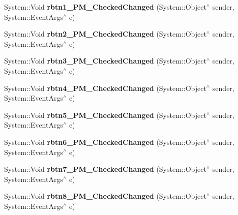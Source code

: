 \begin{DoxyCompactItemize}
\item 
\mbox{\label{class_project1_1_1_my_form_a0cfe390df7f37207a327be05de084f42}} 
System\+::\+Void {\bfseries rbtn1\+\_\+P\+M\+\_\+\+Checked\+Changed} (System\+::\+Object$^\wedge$ sender, System\+::\+Event\+Args$^\wedge$ e)
\item 
\mbox{\label{class_project1_1_1_my_form_a05a976ca2c9bbae2ec960218dfcdef02}} 
System\+::\+Void {\bfseries rbtn2\+\_\+P\+M\+\_\+\+Checked\+Changed} (System\+::\+Object$^\wedge$ sender, System\+::\+Event\+Args$^\wedge$ e)
\item 
\mbox{\label{class_project1_1_1_my_form_a2a141afcaa1fd6b05c3707ab0b256c92}} 
System\+::\+Void {\bfseries rbtn3\+\_\+P\+M\+\_\+\+Checked\+Changed} (System\+::\+Object$^\wedge$ sender, System\+::\+Event\+Args$^\wedge$ e)
\item 
\mbox{\label{class_project1_1_1_my_form_a5fee5c49d6936abb8e66d788d143e2e0}} 
System\+::\+Void {\bfseries rbtn4\+\_\+P\+M\+\_\+\+Checked\+Changed} (System\+::\+Object$^\wedge$ sender, System\+::\+Event\+Args$^\wedge$ e)
\item 
\mbox{\label{class_project1_1_1_my_form_a3b4666bf2b956a6cfbaa11c84649e4b2}} 
System\+::\+Void {\bfseries rbtn5\+\_\+P\+M\+\_\+\+Checked\+Changed} (System\+::\+Object$^\wedge$ sender, System\+::\+Event\+Args$^\wedge$ e)
\item 
\mbox{\label{class_project1_1_1_my_form_a1c059de744cd7a3a2f5140a7e255593e}} 
System\+::\+Void {\bfseries rbtn6\+\_\+P\+M\+\_\+\+Checked\+Changed} (System\+::\+Object$^\wedge$ sender, System\+::\+Event\+Args$^\wedge$ e)
\item 
\mbox{\label{class_project1_1_1_my_form_a9e3fc6a67c40c367f63a0a489a6e259c}} 
System\+::\+Void {\bfseries rbtn7\+\_\+P\+M\+\_\+\+Checked\+Changed} (System\+::\+Object$^\wedge$ sender, System\+::\+Event\+Args$^\wedge$ e)
\item 
\mbox{\label{class_project1_1_1_my_form_af6cbdc447d6510a08a4e7e05f8036ff5}} 
System\+::\+Void {\bfseries rbtn8\+\_\+P\+M\+\_\+\+Checked\+Changed} (System\+::\+Object$^\wedge$ sender, System\+::\+Event\+Args$^\wedge$ e)

\end{DoxyCompactItemize}
